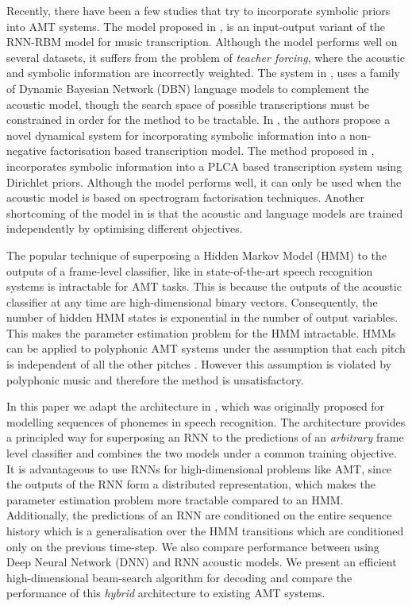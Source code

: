 \documentclass{article}
\begin{document}
Recently, there have been a few studies that try to incorporate symbolic priors into AMT systems. The model proposed in \cite{boulanger2013high}, is an input-output variant of the RNN-RBM model for music transcription. Although the model performs well on several datasets, it suffers from the problem of \emph{teacher forcing}, where the acoustic and symbolic information are incorrectly weighted. The system in \cite{raczynski2013dynamic}, uses a family of Dynamic Bayesian Network (DBN) language models to complement the acoustic model, though the search space of possible transcriptions must be constrained in order for the method to be tractable. In \cite{simsekli2013hierarchical}, the authors propose a novel dynamical system for incorporating symbolic information into a non-negative factorisation based transcription model. The method proposed in \cite{sigtiarnn}, incorporates symbolic information into a PLCA based transcription system using Dirichlet priors. Although the model performs well, it can only be used when the acoustic model is based on spectrogram factorisation techniques. Another shortcoming of the model in \cite{sigtiarnn} is that the acoustic and language models are trained independently by optimising different objectives. 

The popular technique of superposing a Hidden Markov Model (HMM) to the outputs of a frame-level classifier, like in state-of-the-art speech recognition systems \cite{hinton2012deep} is intractable for AMT tasks. This is because the outputs of the acoustic classifier at any time are high-dimensional binary vectors. Consequently, the number of hidden HMM states is exponential in the number of output variables. This makes the parameter estimation problem for the HMM intractable. HMMs can be applied to polyphonic AMT systems under the assumption that each pitch is independent of all the other pitches \cite{poliner2006discriminative}. However this assumption is violated by polyphonic music and therefore the method is unsatisfactory. 

In this paper we adapt the architecture in \cite{boulangerphone}, which was originally proposed for modelling sequences of phonemes in speech recognition. The architecture provides a principled way for superposing an RNN to the predictions of an \emph{arbitrary} frame level classifier and combines the two models under a common training objective. It is advantageous to use RNNs for high-dimensional problems like AMT, since the outputs of the RNN form a distributed representation, which makes the parameter estimation problem more tractable compared to an HMM. Additionally, the predictions of an RNN are conditioned on the entire sequence history which is a generalisation over the HMM transitions which are conditioned only on the previous time-step. We also compare performance between using Deep Neural Network (DNN) and RNN acoustic models. We present an efficient high-dimensional beam-search algorithm for decoding and compare the performance of this \emph{hybrid} architecture to existing AMT systems.
\end{document}
